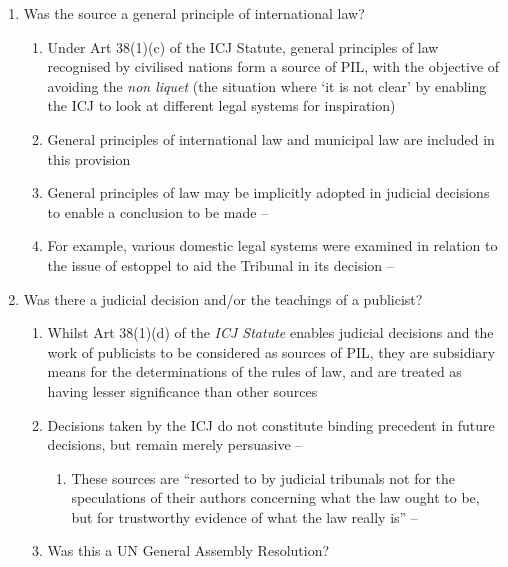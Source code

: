 \begin{enumerate}
\begin{enumerate}
    \end{enumerate}
    \item Was the source a general principle of international law?
    \begin{enumerate}
        \item Under Art 38(1)(c) of the ICJ Statute, general principles of law recognised by civilised nations form a source of PIL, with the objective of avoiding the \textit{non liquet} (the situation where `it is not clear' by enabling the ICJ to look at different legal systems for inspiration)
        \item General principles of international law and municipal law are included in this provision
        \item General principles of law may be implicitly adopted in judicial decisions to enable a conclusion to be made -- 
        \item For example, various domestic legal systems were examined in relation to the issue of estoppel to aid the Tribunal in its decision -- 
    \end{enumerate}
    \item Was there a judicial decision and/or the teachings of a publicist?
    \begin{enumerate}
        \item Whilst Art 38(1)(d) of the \textit{ICJ Statute} enables judicial decisions and the work of publicists to be considered as sources of PIL, they are subsidiary means for the determinations of the rules of law, and are treated as having lesser significance than other sources
        \item Decisions taken by the ICJ do not constitute binding precedent in future decisions, but remain merely persuasive -- 
        \begin{enumerate}
            \item These sources are ``resorted to by judicial tribunals not for the
            speculations of their authors concerning what the law ought to be, but for trustworthy
            evidence of what the law really is'' -- 
        \end{enumerate}
        \item Was this a UN General Assembly Resolution?

\end{enumerate}
\end{enumerate}
